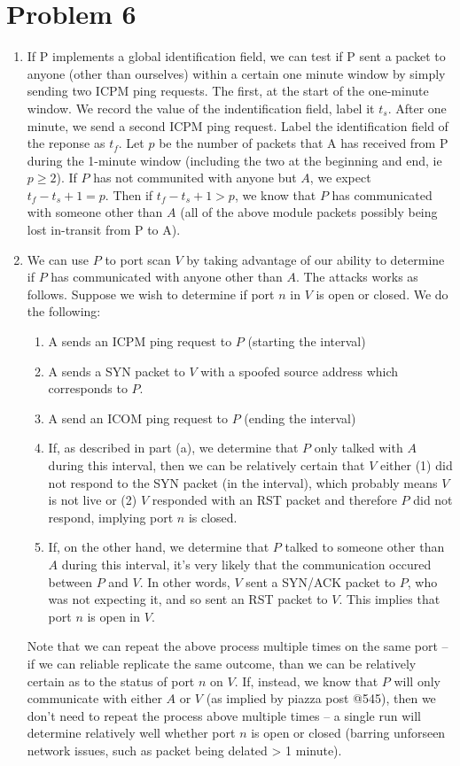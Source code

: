 \documentclass[12pt]{article}
\begin{document}
\section*{Problem 6}
\begin{enumerate}[label=(\alph*)]
\item If P implements a global identification field, we can test if P sent a packet to anyone (other than ourselves) within a certain one minute window by simply sending two ICPM ping requests. The first, at the start of the one-minute window. We record the value of the indentification field, label it $t_s$. After one minute, we send a second ICPM ping request. Label the identification field of the reponse as $t_f$. Let $p$ be the number of packets that A has received from P during the 1-minute window (including the two at the beginning and end, ie $p \geq 2$). If $P$ has not communited with anyone but $A$, we expect $t_f - t_s + 1 = p$. Then if $t_f - t_s +1 > p $, we know that $P$ has communicated with someone other than $A$ (all of the above module packets possibly being lost in-transit from P to A). 
\item We can use $P$ to port scan $V$ by taking advantage of our ability to determine if $P$ has communicated with anyone other than $A$. The attacks works as follows. Suppose we wish to determine if port $n$ in $V$ is open or closed. We do the following:
\begin{enumerate}
	\item A sends an ICPM ping request to $P$ (starting the interval)
	\item A sends a SYN packet to $V$ with a spoofed source address which corresponds to $P$.
	\item A send an ICOM ping request to $P$ (ending the interval)
	\item If, as described in part (a), we determine that $P$ only talked with $A$ during this interval, then we can be relatively certain that $V$ either (1) did not respond to the SYN packet (in the interval), which probably means $V$ is not live or (2) $V$ responded with an RST packet and therefore $P$ did not respond, implying port $n$ is closed.
	\item If, on the other hand, we determine that $P$ talked to someone other than $A$ during this interval, it's very likely that the communication occured between $P$ and $V$. In other words, $V$ sent a SYN/ACK packet to $P$, who was not expecting it, and so sent an RST packet to $V$. This implies that port $n$ is open in $V$.
\end{enumerate}
Note that we can repeat the above process multiple times on the same port -- if we can reliable replicate the same outcome, than we can be relatively certain as to the status of port $n$ on $V$. If, instead, we know that $P$ will only communicate with either $A$ or $V$ (as implied by piazza post @545), then we don't need to repeat the process above multiple times -- a single run will determine relatively well whether port $n$ is open or closed (barring unforseen network issues, such as packet being delated > 1 minute).
\end{enumerate}
\end{document}

